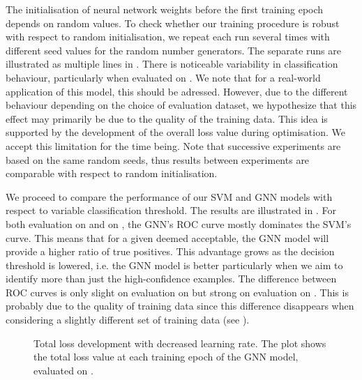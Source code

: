 \documentclass[
	fontsize=10pt, %
	twoside=true, %
	secnumdepth=1, %
  toc=indentunnumbered %
]{kaobook}
\begin{document}
The initialisation of neural network weights before the first training epoch
depends on random values. To check whether our training procedure is robust with
respect to random initialisation, we repeat each run several times with
different seed values for the random number generators. The separate runs are
illustrated as multiple lines in . There is noticeable
variability in classification behaviour, particularly when evaluated on \ReconMap{}.
We note that for a real-world application of this model, this should be
adressed. However, due to the different behaviour depending on the choice of
evaluation dataset, we hypothesize that this effect may primarily be due to the
quality of the training data. This idea is supported by the development of the
overall loss value during optimisation. We accept this limitation for the time
being. Note that successive experiments are based on the same random seeds, thus
results between experiments are comparable with respect to random initialisation.

We proceed to compare the performance of our SVM and GNN models with respect to
variable classification threshold. The results are illustrated in
. For both evaluation on \PDMap{} and on \ReconMap{},
the GNN's ROC curve mostly dominates the SVM's curve. This means that for a given
\FPR{} deemed acceptable, the GNN model will provide a higher ratio of true
positives. This advantage grows as the decision threshold is lowered, i.e. the
GNN model is better particularly when we aim to identify more than just the
high-confidence examples. The difference between ROC curves is only slight on
evaluation on \PDMap{} but strong on evaluation on \ReconMap{}. This is probably
due to the quality of training data since this difference disappears when
considering a slightly different set of training data (see ).

\begin{figure}[h]
  \centering
  \begin{subfigure}[h]{0.49\linewidth}
  \end{subfigure}
  \caption{Total loss development with decreased learning rate. The plot shows
    the total loss value at each training epoch of the GNN model, evaluated on
    \ReconMap{}.}
  \label{fig:svm-repro-lowlr-reconmapolder-loss}
\end{figure}
\end{document}
